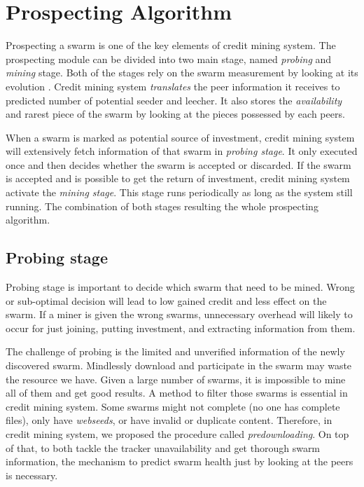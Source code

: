 \chapter{Prospecting Algorithm}
\label{chapter:prospection}
Prospecting a swarm is one of the key elements of credit mining system. The prospecting module can be divided into two main stage, named \textit{probing} and \textit{mining} stage. Both of the stages rely on the swarm measurement by looking at its evolution \cite{2013:swarmevolution:su}. Credit mining system \textit{translates} the peer information it receives to predicted number of potential seeder and leecher. It also stores the \textit{availability} and rarest piece of the swarm by looking at the pieces possessed by each peers. 

When a swarm is marked as potential source of investment, credit mining system will extensively fetch information of that swarm in \textit{probing stage}. It only executed once and then decides whether the swarm is accepted or discarded. If the swarm is accepted and is possible to get the return of investment, credit mining system activate the \textit{mining stage}. This stage runs periodically as long as the system still running. The combination of both stages resulting the whole prospecting algorithm. 

\section{Probing stage}

Probing stage is important to decide which swarm that need to be mined. Wrong or sub-optimal decision will lead to low gained credit and less effect on the swarm. If a miner is given the wrong swarms, unnecessary overhead will likely to occur for just joining, putting investment, and extracting information from them. 

The challenge of probing is the limited and unverified information of the newly discovered swarm. Mindlessly download and participate in the swarm may waste the resource we have. Given a large number of swarms, it is impossible to mine all of them and get good results. A method to filter those swarms is essential in credit mining system. Some swarms might not complete (no one has complete files), only have \textit{webseeds}, or have invalid or duplicate content. Therefore, in credit mining system, we proposed the procedure called \textit{predownloading}. On top of that, to both tackle the tracker unavailability and get thorough swarm information, the mechanism to predict swarm health just by looking at the peers is necessary.

